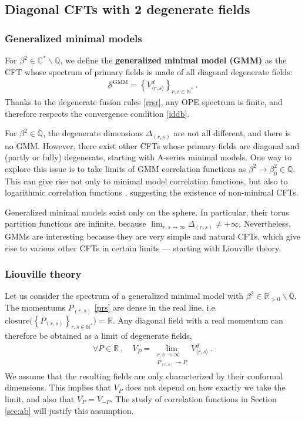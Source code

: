 \documentclass[12pt, a4paper]{article}
\theoremstyle{break}
\begin{document}
\subsection{Diagonal CFTs with 2 degenerate fields}\label{sec:diag}

\subsubsection{Generalized minimal models}\label{sec:gmm}

For $\beta^2\in\mathbb{C}^*\backslash\mathbb{Q}$, we define the \textbf{generalized minimal model (GMM)} as the CFT whose spectrum of primary fields is made of all diagonal degenerate fields:
\begin{align}
 \boxed{\mathcal{S}^\text{GMM} = \left\{ V^d_{\langle r,s\rangle}\right\}_{r,s\in\mathbb{N}^*}} \ . 
\end{align}
Thanks to the degenerate fusion rules \eqref{rrsr}, any OPE spectrum is finite, and therefore respects the convergence condition \eqref{iddb}.

For $\beta^2\in \mathbb{Q}$, the degenerate dimensions $\Delta_{(r,s)}$ are not all different, and there is no GMM. However, there exist other CFTs whose primary fields are diagonal and (partly or fully) degenerate, starting with A-series minimal models. One way to explore this issue is to take limits of GMM correlation functions as $\beta^2\to \beta^2_0\in \mathbb{Q}$. This can give rise not only to minimal model correlation functions, but also to logarithmic correlation functions \cite{rib18}, suggesting the existence of non-minimal CFTs. 

Generalized minimal models exist only on the sphere. In particular, their torus partition functions are infinite, because $\lim_{r,s\to\infty} \Delta_{(r,s)}\neq +\infty$. Nevertheless, GMMs are interesting because they are very simple and natural CFTs, which give rise to various other CFTs in certain limits --- starting with Liouville theory.

\subsubsection{Liouville theory}\label{sec:liou}

Let us consider the spectrum of a generalized minimal model with $\beta^2\in\mathbb{R}_{>0}\backslash\mathbb{Q}$. The momentums $P_{(r,s)}$ \eqref{prs} are dense in the real line, i.e. $\text{closure}\big(\left\{ P_{(r,s)}\right\}_{r,s\in\mathbb{N}^*}\big) = \mathbb{R}$. Any diagonal field with a real momentum can therefore be obtained as a limit of degenerate fields,
\begin{align}
 \forall P\in\mathbb{R}\ , \quad V_P = \lim_{\substack{r,s\to\infty \\ P_{(r,s)}\to P}} V^d_{\langle r,s\rangle}\ .
 \label{vplim}
\end{align}
We assume that the resulting fields are only characterized by their conformal dimensions. This implies that $V_P$ does not depend on how exactly we take the limit, and also that $V_P=V_{-P}$. The study of correlation functions in Section \ref{sec:ab} will justify this assumption.
\end{document}
